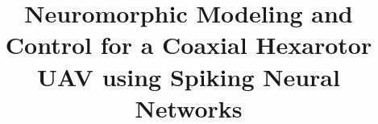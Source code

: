 \documentclass[conference]{IEEEtran}
\begin{document}
\title{Neuromorphic Modeling and Control for a Coaxial Hexarotor UAV using Spiking Neural Networks}
\medskip

\maketitle
\end{document}
